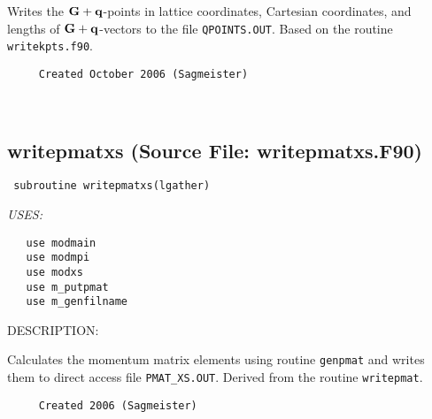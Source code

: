 \documentclass[11pt]{article}
\begin{document}
     Writes the ${\bf G+q}$-points in lattice coordinates, Cartesian 
     coordinates, and lengths of ${\bf G+q}$-vectors to the file 
     {\tt QPOINTS.OUT}. Based on the routine {\tt writekpts.f90}.
  
\begin{verbatim}     Created October 2006 (Sagmeister)\end{verbatim}








 
 
\mbox{}\hrulefill\ 
 
\subsection{writepmatxs (Source File: writepmatxs.F90)}


\begin{verbatim} subroutine writepmatxs(lgather)\end{verbatim}{\em USES:}
\begin{verbatim}   use modmain
   use modmpi
   use modxs
   use m_putpmat
   use m_genfilname\end{verbatim}
{\sf DESCRIPTION:\\ }


     Calculates the momentum matrix elements using routine {\tt genpmat} and
     writes them to direct access file {\tt PMAT\_XS.OUT}. Derived from
     the routine {\tt writepmat}.
  
\begin{verbatim}     Created 2006 (Sagmeister)\end{verbatim}


 
 
\mbox{}\hrulefill\ 
 
\end{document}
